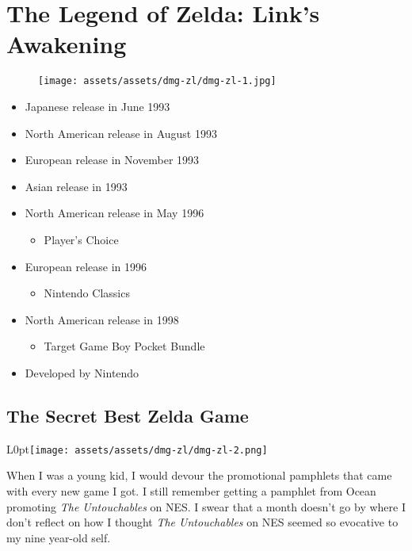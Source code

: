 \documentclass{book}
\begin{document}
\chapter*{The Legend of Zelda: Link’s Awakening}
\vspace{\baselineskip}\begin{figure}[H]{\texttt{[image: assets/assets/dmg-zl/dmg-zl-1.jpg]}}\end{figure}\vspace{\baselineskip}
\begin{itemize}[left=0pt, nosep]
\item Japanese release in June 1993
\item North American release in August 1993
\item European release in November 1993
\item Asian release in 1993
\item North American release in May 1996
\begin{itemize}
\item Player’s Choice
\end{itemize}
\item European release in 1996
\begin{itemize}
\item Nintendo Classics
\end{itemize}
\item North American release in 1998
\begin{itemize}
\item Target Game Boy Pocket Bundle
\end{itemize}
\item Developed by Nintendo

\end{itemize}
\newpage\FloatBarrier\section*{The Secret Best Zelda Game}
\begin{wrapfigure}{L}{0pt}{\texttt{[image: assets/assets/dmg-zl/dmg-zl-2.png]}}\end{wrapfigure}\noindent
When I was a young kid, I would devour the promotional pamphlets that came with every new game I got. I still remember getting a pamphlet from Ocean promoting \emph{The Untouchables} on NES. I swear that a month doesn’t go by where I don’t reflect on how I thought \emph{The Untouchables} on NES seemed so evocative to my nine year-old self.\par
\end{document}

